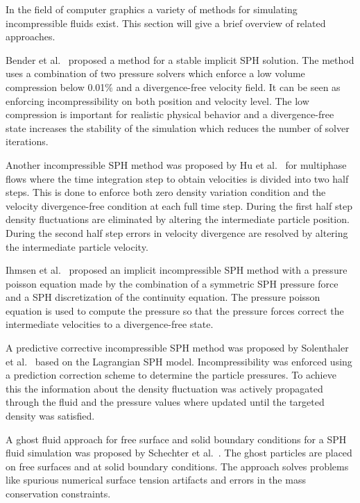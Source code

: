     In the field of computer graphics a variety of methods for simulating incompressible fluids exist.
    This section will give a brief overview of related approaches.

    Bender et al.~\cite{bender} proposed a method for a stable implicit SPH solution.
    The method uses a combination of two pressure solvers which enforce a low volume compression below 0.01$\%$ and a divergence-free velocity field.
    It can be seen as enforcing incompressibility on both position and velocity level.
    The low compression is important for realistic physical behavior and a divergence-free state increases the stability of the simulation which reduces the number of solver iterations.

    Another incompressible SPH method was proposed by Hu et al.~\cite{hu} for multiphase flows where the time integration step to obtain velocities is divided into two half steps.
    This is done to enforce both zero density variation condition and the velocity divergence-free condition at each full time step.
    During the first half step density fluctuations are eliminated by altering the intermediate particle position.
    During the second half step errors in velocity divergence are resolved by altering the intermediate particle velocity.

    Ihmsen et al.~\cite{ihmsen2014implicit} proposed an implicit incompressible SPH method with a pressure poisson equation made by the combination of a symmetric SPH pressure force and a SPH discretization of the continuity equation.
    The pressure poisson equation is used to compute the pressure so that the pressure forces correct the intermediate velocities to a divergence-free state.
    
    A predictive corrective incompressible SPH method was proposed by Solenthaler et al.~\cite{solenthaler} based on the Lagrangian SPH model.
    Incompressibility was enforced using a prediction correction scheme to determine the particle pressures.
    To achieve this the information about the density fluctuation was actively propagated through the fluid and the pressure values where updated until the targeted density was satisfied.

    A ghost fluid approach for free surface and solid boundary conditions for a SPH fluid simulation was proposed by Schechter et al.~\cite{ghost}.
    The ghost particles are placed on free surfaces and at solid boundary conditions.
    The approach solves problems like spurious numerical surface tension artifacts and errors in the mass conservation constraints.


